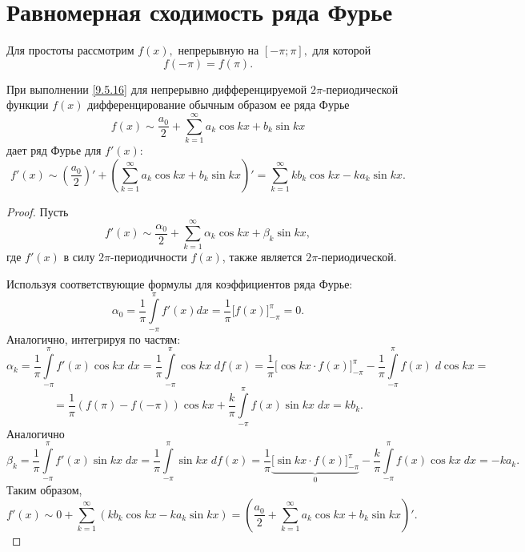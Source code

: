 \documentclass[../../main.tex]{subfiles}
\begin{document}
\section{Равномерная сходимость ряда Фурье}
	Для простоты рассмотрим $f(x),$ непрерывную на $[-\pi; \pi],$ для которой 
	\begin{equation}\label{9.5.16}
	f(-\pi) = f(\pi).
	\end{equation}
	\begin{thm}
		При выполнении \eqref{9.5.16} для непрерывно дифференцируемой 
		$2\pi$-периодической функции $f(x)$ дифференцирование обычным образом ее 
		ряда 
		Фурье
		\[
		f(x) \sim \frac{a_0}{2} + \sum_{k=1}^{\infty}  a_k \cos k x +
		b_k \sin k x
		\]
		дает ряд Фурье для $f'(x):$
		\begin{equation} \label{9.5.17}
			f'(x) \sim \left(\frac{a_0}{2}\right)' + \left(\sum_{k=1}^{\infty}  a_k 
			\cos k x +
			b_k \sin k x\right)' = \sum_{k=1}^{\infty} k b_k \cos k x - k
			a_k \sin k x.
		\end{equation}
	\end{thm}
	\begin{proof}
		Пусть
		\[
			f'(x) \sim \frac{\alpha_0}{2} + \sum_{k=1}^{\infty}  \alpha_k \cos k x +
			\beta_k \sin k x,
		\]
		где $f'(x)$ в силу $2\pi$-периодичности $f(x)$, также является 
		$2\pi$-периодической.
		
		Используя соответствующие формулы для коэффициентов ряда Фурье:
		\[
			\alpha_0 = \frac{1}{\pi} \int\limits_{-\pi}^{\pi} f'(x) dx = \frac{1}{\pi} 
			\big[f(x)\big]_{-\pi}^{\pi} = 0.
		\]
		Аналогично, интегрируя по частям:
		\[
			\alpha_k = \frac{1}{\pi} \int\limits_{-\pi}^{\pi} f'(x) \cos kx\; dx = 
			\frac{1}{\pi} 
			\int\limits_{-\pi}^{\pi} \cos kx\; df(x)  = \frac{1}{\pi} \big[\cos kx
			\cdot f(x)\big]_{-\pi}^{\pi} -
			\frac{1}{\pi} \int\limits_{-\pi}^{\pi} f(x)\;d \cos kx = 
			\]
			\[ =
			\frac{1}{\pi} (f(\pi) - f(-\pi)) \cos kx +
			\frac{k}{\pi} \int\limits_{-\pi}^{\pi} f(x)\sin kx\;dx = k b_k.
		\]
		Аналогично
		\[
			\beta_k = \frac{1}{\pi} \int\limits_{-\pi}^{\pi} f'(x) \sin kx\;dx
			= \frac{1}{\pi} \int\limits_{-\pi}^{\pi} \sin kx\;df(x)  =
			\frac{1}{\pi} \underbrace{\big[\sin kx \cdot f(x)\big]_{-\pi}^{\pi}}_{0} -
			\frac{k}{\pi} \int\limits_{-\pi}^{\pi} f(x) \cos kx\;dx = -ka_k.
		\]
		Таким образом, 
		\[
		f'(x) \sim 0 + \sum_{k=1}^{\infty}( k b_k \cos k x - k
		a_k \sin k x) = \left(\frac{a_0}{2} + \sum_{k=1}^{\infty}  a_k \cos k x +
		b_k \sin k x\right)'.
		\]
	\end{proof}
\end{document}
